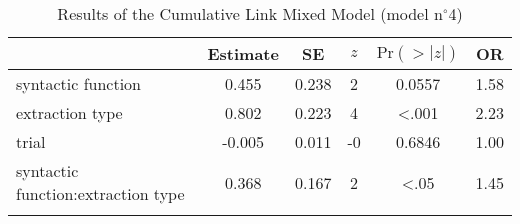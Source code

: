 \begin{table}
\begin{tabularx}{\textwidth}{Q S[table-format=-1.3] S[table-format=1.3] S[table-format=-1] S[table-format=<1.4] S[table-format=1.2]}
  \lsptoprule
 & {Estimate} & {SE} & {$z$} & {$\text{Pr}(>|z|)$} & {OR} \\ 
  \midrule
  syntactic function & 0.455 & 0.238 & 2 & 0.0557 & 1.58 \\ 
  extraction type & 0.802 & 0.223 & 4 & <.001 & 2.23 \\ 
  trial & -0.005 & 0.011 & -0 & 0.6846 & 1.00 \\ 
  syntactic function:extraction type & 0.368 & 0.167 & 2 & <.05 & 1.45 \\ 
   \lspbottomrule
\end{tabularx}
\caption{Results of the Cumulative Link Mixed Model (model n$^{\circ}$4)}
\label{tab:exp14-m4}
\end{table}
